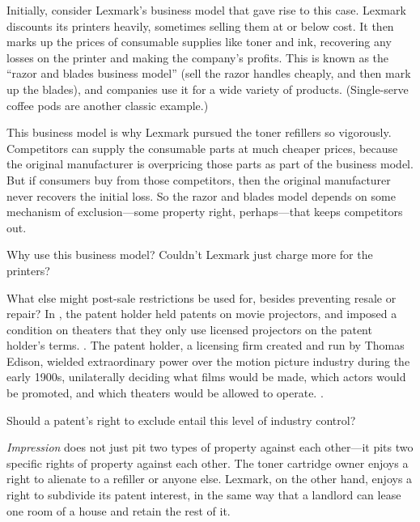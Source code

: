 \item Initially, consider Lexmark's business model that gave rise to this case.
Lexmark discounts its printers heavily, sometimes selling them at or below cost.
It then marks up the prices of consumable supplies like toner and ink,
recovering any losses on the printer and making the company's profits. This
is known as the ``razor and blades business model'' (sell the razor handles
cheaply, and then mark up the blades), and companies use it for a wide variety
of products. (Single-serve coffee pods are another classic example.)

This business model is why Lexmark pursued the toner refillers so vigorously.
Competitors can supply the consumable parts at much cheaper prices, because the
original manufacturer is overpricing those parts as part of the business model.
But if consumers buy from those competitors, then the original manufacturer
never recovers the initial loss. So the razor and blades model depends on some
mechanism of exclusion---some property right, perhaps---that keeps competitors
out.

Why use this business model? Couldn't Lexmark just charge more for the printers?




\item What else might post-sale restrictions be used for, besides preventing
resale or repair? In , the patent holder held patents on movie
projectors, and imposed a condition on theaters that they only use licensed
projectors on the patent holder's terms. . The
patent holder, a licensing firm created and run by Thomas Edison, wielded
extraordinary power over the motion picture industry during the early 1900s,
unilaterally deciding what films would be made, which actors would be promoted,
and which theaters would be allowed to operate. .

Should a patent's right to exclude entail this level of industry control?


\item \emph{Impression} does not just pit two types of property against each
other---it pits two specific rights of property against each other. The toner
cartridge owner enjoys a right to alienate to a refiller or anyone else.
Lexmark, on the other hand, enjoys a right to subdivide its patent interest, in
the same way that a landlord can lease one room of a house and retain the rest
of it.

